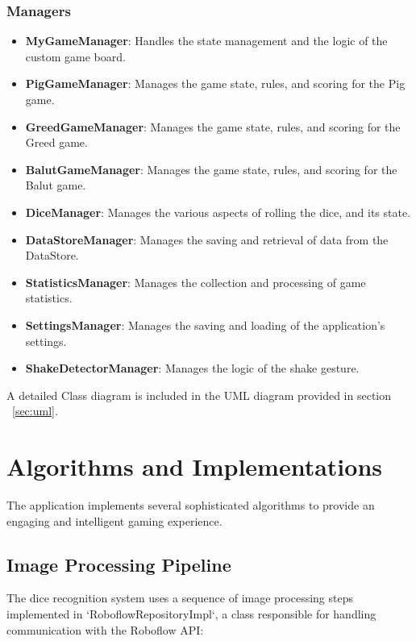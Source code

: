 \subsubsection{Managers}
\begin{itemize}
    \item \textbf{MyGameManager}: Handles the state management and the logic of the custom game board.
    \item \textbf{PigGameManager}: Manages the game state, rules, and scoring for the Pig game.
     \item \textbf{GreedGameManager}: Manages the game state, rules, and scoring for the Greed game.
    \item \textbf{BalutGameManager}: Manages the game state, rules, and scoring for the Balut game.
     \item \textbf{DiceManager}: Manages the various aspects of rolling the dice, and its state.
    \item \textbf{DataStoreManager}: Manages the saving and retrieval of data from the DataStore.
     \item \textbf{StatisticsManager}: Manages the collection and processing of game statistics.
    \item \textbf{SettingsManager}: Manages the saving and loading of the application's settings.
     \item \textbf{ShakeDetectorManager}: Manages the logic of the shake gesture.
\end{itemize}

\vspace{0.2cm}
A detailed Class diagram is included in the UML diagram provided in section ~\ref{sec:uml}.

\section{Algorithms and Implementations}

The application implements several sophisticated algorithms to provide an engaging and intelligent gaming experience. 

\subsection{Image Processing Pipeline}

The dice recognition system uses a sequence of image processing steps implemented in `RoboflowRepositoryImpl`, a class responsible for handling communication with the Roboflow API:
